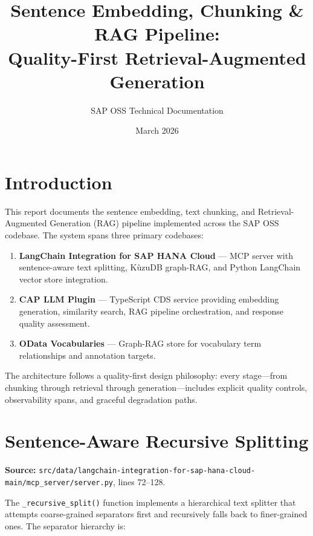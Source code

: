 \documentclass[11pt]{article}
\title{Sentence Embedding, Chunking \& RAG Pipeline:\\Quality-First Retrieval-Augmented Generation}
\author{SAP OSS Technical Documentation}
\date{March 2026}
\begin{document}
\maketitle
\tableofcontents
\newpage

\section{Introduction}

This report documents the sentence embedding, text chunking, and Retrieval-Augmented
Generation (RAG) pipeline implemented across the SAP OSS codebase. The system spans
three primary codebases:

\begin{enumerate}
  \item \textbf{LangChain Integration for SAP HANA Cloud} --- MCP server with
        sentence-aware text splitting, KùzuDB graph-RAG, and Python LangChain
        vector store integration.
  \item \textbf{CAP LLM Plugin} --- TypeScript CDS service providing embedding
        generation, similarity search, RAG pipeline orchestration, and response
        quality assessment.
  \item \textbf{OData Vocabularies} --- Graph-RAG store for vocabulary term
        relationships and annotation targets.
\end{enumerate}

The architecture follows a quality-first design philosophy: every stage---from
chunking through retrieval through generation---includes explicit quality controls,
observability spans, and graceful degradation paths.

\section{Sentence-Aware Recursive Splitting}
\label{sec:recursive-split}

\noindent\textbf{Source:}
\texttt{src/data/langchain-integration-for-sap-hana-cloud-main/mcp\_server/server.py},
lines 72--128.

The \texttt{\_recursive\_split()} function implements a hierarchical text splitter
that attempts coarse-grained separators first and recursively falls back to
finer-grained ones. The separator hierarchy is:
\end{document}
